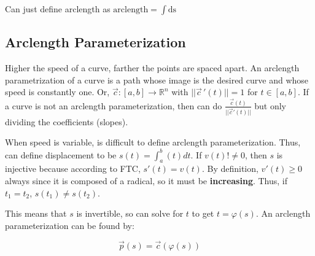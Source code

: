 Can just define arclength as $\text{arclength}=\int \mathrm{ds}$

\subsection{Arclength Parameterization}

Higher the speed of a curve, farther the points are spaced apart.
An arclength parametrization of a curve is a path whose image is the desired curve and whose speed is constantly one.
Or, $\vec{c}:[a,b]\to\mathbb{R}^n$ with $||\vec{c}\,'(t)||=1$ for $t\in[a,b]$.
If a curve is not an arclength parameterization, then can do $\frac{\vec{c}(t)}{||\vec{c}'(t)||}$ but only dividing the coefficients (slopes).\newline

\noindent
When speed is variable, is difficult to define arclength parameterization.
Thus, can define displacement to be $s(t)=\int_a^b (t)dt$. If $v(t)!\neq 0$,
then $s$ is injective because according to FTC, $s'(t)=v(t)$.
By definition, $v'(t)\geq 0$ always since it is composed of a radical, so it must be \textbf{increasing}.
Thus, if $t_1=t_2$, $s(t_1)\neq s(t_2)$.\newline

\noindent
This means that $s$ is invertible, so can solve for $t$ to get $t=\varphi(s)$.
An arclength parameterization can be found by:

\[\boxed{\vec{p}(s)=\vec{c}(\varphi(s))}\]